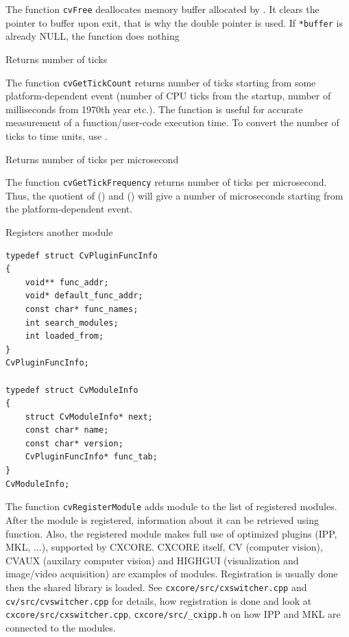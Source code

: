 The function \texttt{cvFree} deallocates memory buffer allocated by
. It clears the pointer to buffer upon exit, that is why
the double pointer is used. If \texttt{*buffer} is already NULL, the function
does nothing

\label{GetTickCount}

Returns number of ticks


The function \texttt{cvGetTickCount} returns number of ticks starting from some platform-dependent event (number of CPU ticks from the startup, number of milliseconds from 1970th year etc.). The function is useful for accurate measurement of a function/user-code execution time. To convert the number of ticks to time units, use .

\label{GetTickFrequency}

Returns number of ticks per microsecond


The function \texttt{cvGetTickFrequency} returns number of ticks per microsecond. Thus, the quotient of () and () will give a number of microseconds starting from the platform-dependent event.

\label{RegisterModule}

Registers another module

\begin{lstlisting}
typedef struct CvPluginFuncInfo
{
    void** func_addr;
    void* default_func_addr;
    const char* func_names;
    int search_modules;
    int loaded_from;
}
CvPluginFuncInfo;

typedef struct CvModuleInfo
{
    struct CvModuleInfo* next;
    const char* name;
    const char* version;
    CvPluginFuncInfo* func_tab;
}
CvModuleInfo;
\end{lstlisting}


\begin{description}
\end{description}

The function \texttt{cvRegisterModule} adds module to the list of
registered modules. After the module is registered, information about
it can be retrieved using  function. Also, the
registered module makes full use of optimized plugins (IPP, MKL, ...),
supported by CXCORE. CXCORE itself, CV (computer vision), CVAUX (auxilary
computer vision) and HIGHGUI (visualization and image/video acquisition) are
examples of modules. Registration is usually done then the shared library
is loaded. See \texttt{cxcore/src/cxswitcher.cpp} and
\texttt{cv/src/cvswitcher.cpp} for details, how registration is done
and look at \texttt{cxcore/src/cxswitcher.cpp}, \texttt{cxcore/src/\_cxipp.h}
on how IPP and MKL are connected to the modules.

